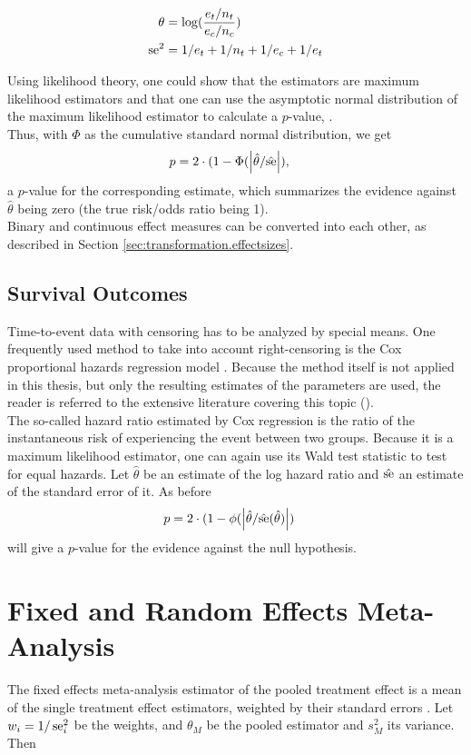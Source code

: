 \documentclass[11pt,a4paper,twoside]{book}\usepackage[]{graphicx}\usepackage[]{color}
\begin{document}
\begin{align}
\theta &= \log(\frac{e_t/n_t}{e_c/n_c}) \label{eq:risk.ratio} \\
\operatorname{se}^2&= 1/e_t + 1/n_t + 1/e_c + 1/e_t \label{eq:risk.ratio.variance}
\end{align}

Using likelihood theory, one could show that the estimators are maximum likelihood estimators and that one can use the asymptotic normal distribution of the maximum likelihood estimator to calculate a $p$-value, \eg \cite[98]{held2014}. \\
Thus, with $\Phi$ as the cumulative standard normal distribution, we get
\begin{align}
p &= 2\cdot(1-\Phi(\left\lvert\hat{\theta}/\hat{\operatorname{se}}\right\rvert), \nonumber
\end{align}
a $p$-value for the corresponding estimate, which summarizes the evidence against $\hat{\theta}$ being zero (\ie the true risk/odds ratio being 1). \\
Binary and continuous effect measures can be converted into each other, as described in Section \ref{sec:transformation.effectsizes}.

\subsection{Survival Outcomes}
Time-to-event data with censoring has to be analyzed by special means. One frequently used method to take into account right-censoring is the Cox proportional hazards regression model \citep{Cox}. Because the method itself is not applied in this thesis, but only the resulting estimates of the parameters are used, the reader is referred to the extensive literature covering this topic (\eg \citet{Surv}). \\
The so-called hazard ratio estimated by Cox regression is the ratio of the instantaneous risk of experiencing the event between two groups. Because it is a maximum likelihood estimator, one can again use its Wald test statistic to test for equal hazards. Let $\hat{\theta}$ be an estimate of the log hazard ratio and $\hat{\operatorname{se}}$ an estimate of the standard error of it. As before
\begin{align}
p &= 2\cdot(1-\phi(\left\lvert\hat{\theta}/\hat{\operatorname{se}}(\hat{\theta})\right\rvert) \nonumber
\end{align}
will give a $p$-value for the evidence against the null hypothesis.



\section{Fixed and Random Effects Meta-Analysis} \label{sec:meta.analysis}
The fixed effects meta-analysis estimator of the pooled treatment effect is a mean of the single treatment effect estimators, weighted by their standard errors \citep{fixed.effects.rosenthal}. Let $w_i = 1/\operatorname{se}_i^2$ be the weights, and $\theta_M$ be the pooled estimator and $s_M^2$ its variance. Then 
\end{document}
